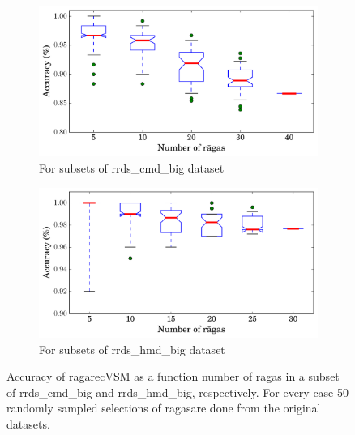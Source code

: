 \begin{figure}
	\begin{subfigure}{\textwidth}
		\centering
		\includegraphics[width=\figSizeEightyFive]{ch07_ragaRecognition/figures/Accuracy_Vs_Size_n_raagas_cmd.pdf}
		\caption{For subsets of \acrshort{rrds_cmd_big} dataset}
		\label{fig:performance_vs_n_raagas_cmd}
	\end{subfigure}
	\begin{subfigure}{\textwidth}
		\centering
		\includegraphics[width=\figSizeEightyFive]{ch07_ragaRecognition/figures/Accuracy_Vs_Size_n_raagas_hmd.pdf}
		\caption{For subsets of \acrshort{rrds_hmd_big} dataset}
		\label{fig:performance_vs_n_raagas_hmd}
	\end{subfigure}
	\caption[Accuracy of \acrshort{ragarecVSM} as a function number of \glspl{raga} in a subset of \acrshort{rrds_cmd_big}  and \acrshort{rrds_hmd_big}]{Accuracy of \acrshort{ragarecVSM} as a function number of \glspl{raga} in a subset of \acrshort{rrds_cmd_big}  and \acrshort{rrds_hmd_big}, respectively. For every case 50 randomly sampled selections of \glspl{raga}are done from the original datasets.}
	\label{fig:performance_vs_n_raagas}
\end{figure}

